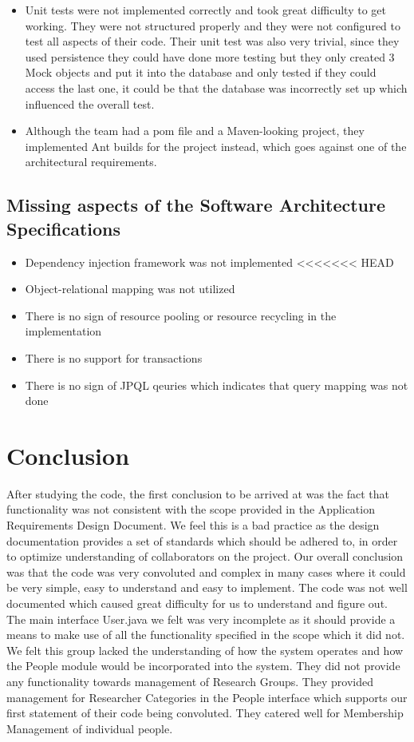 \documentclass{article}
\begin{document}
	\begin{itemize}

		\item Unit tests were not implemented correctly and took great difficulty to get working. They were not structured properly and they were not configured to test all aspects of their code. Their unit test was also very trivial, since they used persistence they could have done more testing but they only created 3 Mock objects and put it into the database and only tested if they could access the last one, it could be that the database was incorrectly set up which influenced the overall test.
		\item Although the team had a pom file and a Maven-looking project, they implemented Ant builds for the project instead, which goes against one of the architectural requirements.
	\end{itemize}

	\subsection{Missing aspects of the Software Architecture Specifications}
	\begin{itemize}
		\item Dependency injection framework was not implemented
<<<<<<< HEAD
		\item Object-relational mapping was not utilized
		\item There is no sign of resource pooling or resource recycling in the implementation
		\item There is no support for transactions
		\item There is no sign of JPQL qeuries which indicates that query mapping was not done
	\end{itemize}
	

\section{Conclusion}
After studying the code, the first conclusion to be arrived at was the fact that functionality was not consistent with the scope provided in the Application Requirements Design Document. We feel this is a bad practice as the design documentation provides a set of standards which should be adhered to, in order to optimize understanding of collaborators on the project.  Our overall conclusion was that the code was very convoluted and complex in many cases where it could be very simple, easy to understand and easy to implement. The code was not well documented which caused great difficulty for us to understand and figure out. The main interface User.java we felt was very incomplete as it should provide a means to make use of all the functionality specified in the scope which it did not. We felt this group lacked the understanding of how the system operates and how the People module would be incorporated into the system. They did not provide any functionality towards management of Research Groups. They provided management for Researcher Categories in the People interface which supports our first statement of their code being convoluted. They catered well for Membership Management of individual people.
\end{document}

